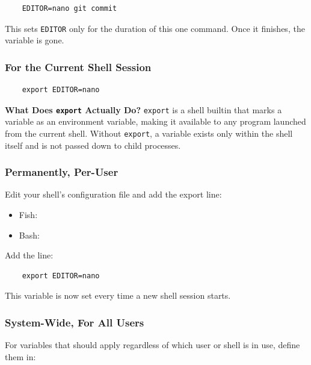 \documentclass{article}
\newcommand{\code}[1]{\colorbox{codebg}{\texttt{#1}}}
\begin{document}
\begin{verbatim}
	EDITOR=nano git commit
\end{verbatim}

\noindent This sets \code{EDITOR} only for the duration of this one command.
Once it finishes, the variable is gone.

\subsubsection{For the Current Shell Session}

\begin{verbatim}
	export EDITOR=nano
\end{verbatim}

\begin{callout}{\textbf{What Does \texttt{export} Actually Do?}}
	\code{export} is a shell builtin that marks a variable as an environment
	variable, making it available to any program launched from the current shell.
	Without \code{export}, a variable exists only within the shell itself and is
	not passed down to child processes.
\end{callout}

\subsubsection{Permanently, Per-User}

Edit your shell's configuration file and add the export line:

\begin{itemize}[leftmargin=1.5em, nosep, label={\tiny\textbullet}]
	\item Fish: 
	\item Bash: 
\end{itemize}

\noindent Add the line:

\begin{verbatim}
	export EDITOR=nano
\end{verbatim}

\noindent This variable is now set every time a new shell session starts.

\subsubsection{System-Wide, For All Users}

For variables that should apply regardless of which user or shell is in use,
define them in:
\end{document}

